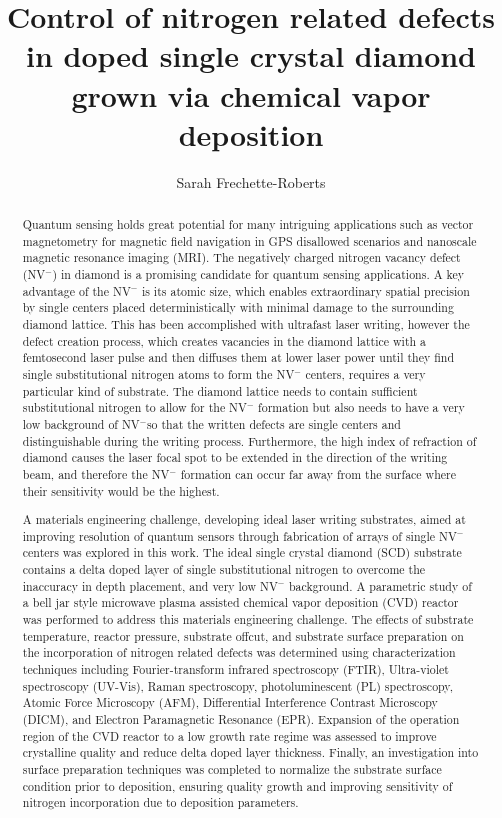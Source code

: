 \documentclass{msuphddissertation_ssn}
\author{Sarah Frechette-Roberts} %
\title{Control of nitrogen related defects in doped single crystal diamond grown via chemical vapor deposition} %
\begin{document}
\begin{otherlanguage}{english}
\maketitlepage %
\begin{abstract}
\indent

Quantum sensing holds great potential for many intriguing applications such as vector magnetometry for magnetic field navigation in GPS disallowed scenarios and nanoscale magnetic resonance imaging (MRI). The negatively charged nitrogen vacancy defect (NV$^-$) in diamond is a promising candidate for quantum sensing applications. A key advantage of the NV$^−$ is its atomic size, which enables extraordinary spatial precision by single centers placed deterministically with minimal damage to the surrounding diamond lattice.  This has been accomplished with ultrafast laser writing, however the defect creation process, which creates vacancies in the diamond lattice with a femtosecond laser pulse and then diffuses them at lower laser power until they find single substitutional nitrogen atoms to form the NV$^-$ centers, requires a very particular kind of substrate. The diamond lattice needs to contain sufficient substitutional nitrogen to allow for the NV$^-$ formation but also needs to have a very low background of NV$^-$so that the written defects are single centers and distinguishable during the writing process. Furthermore, the high index of refraction of diamond causes the laser focal spot to be extended in the direction of the writing beam, and therefore the NV$^-$ formation can occur far away from the surface where their sensitivity would be the highest. 

A materials engineering challenge, developing ideal laser writing substrates, aimed at improving resolution of quantum sensors through fabrication of arrays of single NV$^-$ centers was explored in this work. The ideal single crystal diamond (SCD) substrate contains a delta doped layer of single substitutional nitrogen to overcome the inaccuracy in depth placement, and very low NV$^-$ background. A parametric study of a bell jar style microwave plasma assisted chemical vapor deposition (CVD) reactor was performed to address this materials engineering challenge. The effects of substrate temperature, reactor pressure, substrate offcut, and substrate surface preparation on the incorporation of nitrogen related defects was determined using characterization techniques including Fourier-transform infrared spectroscopy (FTIR), Ultra-violet spectroscopy (UV-Vis), Raman spectroscopy, photoluminescent (PL) spectroscopy, Atomic Force Microscopy (AFM), Differential Interference Contrast Microscopy (DICM), and Electron Paramagnetic Resonance (EPR). Expansion of the operation region of the CVD reactor to a low growth rate regime was assessed to improve crystalline quality and reduce delta doped layer thickness. Finally, an investigation into surface preparation techniques was completed to normalize the substrate surface condition prior to deposition, ensuring quality growth and improving sensitivity of nitrogen incorporation due to deposition parameters.


\end{abstract}
\end{otherlanguage}
\end{document}
